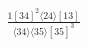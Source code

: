 \documentclass[varwidth, border=5pt]{standalone}
\begin{document}
\begin{my}
$\begin{gathered}
\scriptscriptstyle\frac{1[34]^2⟨24⟩[13]}{⟨34⟩⟨35⟩[35]^3}
\end{gathered}$
\end{my}
\end{document}
